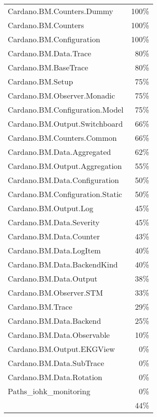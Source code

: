 \begin{tabular}{l r}
   Cardano.BM.Counters.Dummy & 100\% \\
   Cardano.BM.Counters & 100\% \\
   Cardano.BM.Configuration & 100\% \\
   Cardano.BM.Data.Trace & 80\% \\
   Cardano.BM.BaseTrace & 80\% \\
   Cardano.BM.Setup & 75\% \\
   Cardano.BM.Observer.Monadic & 75\% \\
   Cardano.BM.Configuration.Model & 75\% \\
   Cardano.BM.Output.Switchboard & 66\% \\
   Cardano.BM.Counters.Common & 66\% \\
   Cardano.BM.Data.Aggregated & 62\% \\
   Cardano.BM.Output.Aggregation & 55\% \\
   Cardano.BM.Data.Configuration & 50\% \\
   Cardano.BM.Configuration.Static & 50\% \\
   Cardano.BM.Output.Log & 45\% \\
   Cardano.BM.Data.Severity & 45\% \\
   Cardano.BM.Data.Counter & 43\% \\
   Cardano.BM.Data.LogItem & 40\% \\
   Cardano.BM.Data.BackendKind & 40\% \\
   Cardano.BM.Data.Output & 38\% \\
   Cardano.BM.Observer.STM & 33\% \\
   Cardano.BM.Trace & 29\% \\
   Cardano.BM.Data.Backend & 25\% \\
   Cardano.BM.Data.Observable & 10\% \\
   Cardano.BM.Output.EKGView & 0\% \\
   Cardano.BM.Data.SubTrace & 0\% \\
   Cardano.BM.Data.Rotation & 0\% \\
   Paths\_iohk\_monitoring & 0\% \\
    & 44\% \\
\end{tabular}
